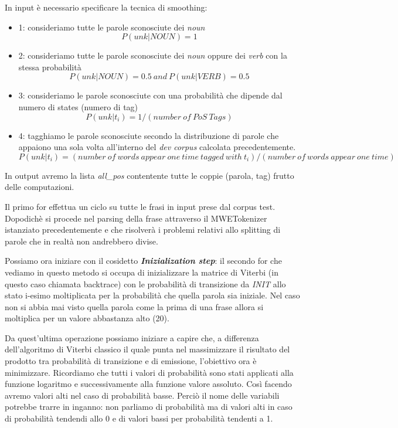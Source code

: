 \documentclass[11pt]{article}
\providecommand{\tightlist}{%
      \setlength{\itemsep}{0pt}\setlength{\parskip}{0pt}}
\begin{document}
In input è necessario specificare la tecnica di smoothing:

\begin{itemize}
\tightlist
\item
  1: consideriamo tutte le parole sconosciute dei \emph{noun}\\
  \[
      P(unk|NOUN) =1
  \]
\item
  2: consideriamo tutte le parole sconosciute dei \emph{noun} oppure dei
  \emph{verb} con la stessa probabilità\\
  \[
      P(unk|NOUN) =0.5 \ and \ P(unk|VERB) = 0.5
  \]
\item
  3: consideriamo le parole sconosciute con una probabilità che dipende
  dal numero di states (numero di tag) \[
      P(unk|t_i) = 1/(number \ of \ PoS \ Tags)
  \]
\item
  4: tagghiamo le parole sconosciute secondo la distribuzione di parole
  che appaiono una sola volta all'interno del \emph{dev corpus}
  calcolata precedentemente. \[
      P(unk|t_i) = (number \ of \ words \ appear \ one \ time \ tagged \ with \ t_i)/(number \ of \ words \ appear \ one \ time)
  \]
\end{itemize}

In output avremo la lista \emph{all\_pos} contentente tutte le coppie
(parola, tag) frutto delle computazioni.

Il primo for effettua un ciclo su tutte le frasi in input prese dal
corpus test. Dopodichè si procede nel parsing della frase attraverso il
MWETokenizer istanziato precedentemente e che risolverà i problemi
relativi allo splitting di parole che in realtà non andrebbero divise.

Possiamo ora iniziare con il cosidetto \textbf{\emph{Inizialization
step}}: il secondo for che vediamo in questo metodo si occupa di
inizializzare la matrice di Viterbi (in questo caso chiamata backtrace)
con le probabilità di transizione da \emph{INIT} allo stato i-esimo
moltiplicata per la probabilità che quella parola sia iniziale. Nel caso
non si abbia mai visto quella parola come la prima di una frase allora
si moltiplica per un valore abbastanza alto (20).

Da quest'ultima operazione possiamo iniziare a capire che, a differenza
dell'algoritmo di Viterbi classico il quale punta nel massimizzare il
risultato del prodotto tra probabilità di transizione e di emissione,
l'obiettivo ora è minimizzare. Ricordiamo che tutti i valori di
probabilità sono stati applicati alla funzione logaritmo e
successivamente alla funzione valore assoluto. Così facendo avremo
valori alti nel caso di probabilità basse. Perciò il nome delle
variabili potrebbe trarre in inganno: non parliamo di probabilità ma di
valori alti in caso di probabilità tendendi allo 0 e di valori bassi per
probabilità tendenti a 1.
\end{document}
